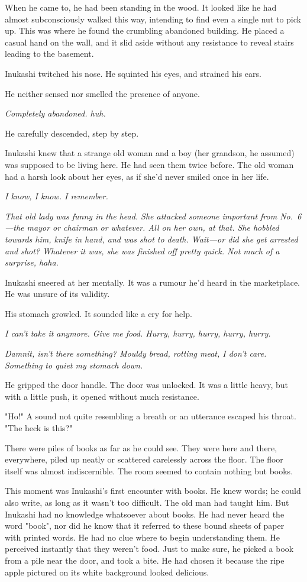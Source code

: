 When he came to, he had been standing in the wood. It looked like he had
almost subconsciously walked this way, intending to find even a single
nut to pick up. This was where he found the crumbling abandoned
building. He placed a casual hand on the wall, and it slid aside without
any resistance to reveal stairs leading to the basement.

Inukashi twitched his nose. He squinted his eyes, and strained his ears.

He neither sensed nor smelled the presence of anyone.

\emph{Completely abandoned. huh.}

He carefully descended, step by step.

Inukashi knew that a strange old woman and a boy (her grandson, he
assumed) was supposed to be living here. He had seen them twice before.
The old woman had a harsh look about her eyes, as if she'd never smiled
once in her life.

\emph{I know, I know. I remember.}

\emph{That old lady was funny in the head. She attacked someone important from
No.~6---the mayor or chairman or whatever. All on her own, at that. She
hobbled towards him, knife in hand, and was shot to death. Wait---or did
she get arrested and shot? Whatever it was, she was finished off pretty
quick. Not much of a surprise, haha.}

Inukashi sneered at her mentally. It was a rumour he'd heard in the
marketplace. He was unsure of its validity.

His stomach growled. It sounded like a cry for help.

\emph{I can't take it anymore. Give me food. Hurry, hurry, hurry, hurry,
hurry.}

\emph{Damnit, isn't there something? Mouldy bread, rotting meat, I don't care.
Something to quiet my stomach down.}

He gripped the door handle. The door was unlocked. It was a little
heavy, but with a little push, it opened without much resistance.

"Ho!" A sound not quite resembling a breath or an utterance escaped his
throat. "The heck is this?"

There were piles of books as far as he could see. They were here and
there, everywhere, piled up neatly or scattered carelessly across the
floor. The floor itself was almost indiscernible. The room seemed to
contain nothing but books.

This moment was Inukashi's first encounter with books. He knew words; he
could also write, as long as it wasn't too difficult. The old man had
taught him. But Inukashi had no knowledge whatsoever about books. He had
never heard the word "book", nor did he know that it referred to these
bound sheets of paper with printed words. He had no clue where to begin
understanding them. He perceived instantly that they weren't food. Just
to make sure, he picked a book from a pile near the door, and took a
bite. He had chosen it because the ripe apple pictured on its white
background looked delicious.

